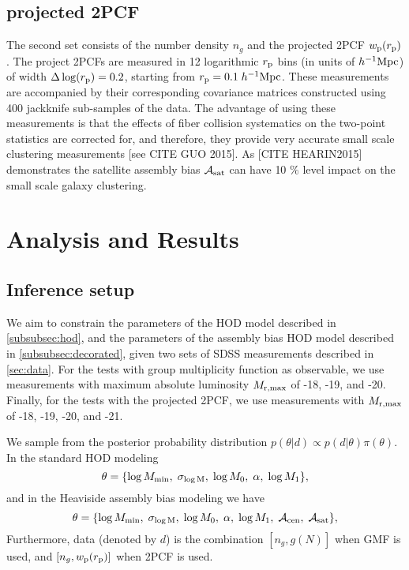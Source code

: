\documentclass[12pt, preprint]{emulateapj}
\newcommand{\beq}{\begin{equation}}
\newcommand{\eeq}{\end{equation}}
\newcommand{\mzero}{\log M_{0}}
\newcommand{\mone}{\log M_{1}}
\newcommand{\mmin}{\log M_{\rm min}}
\newcommand{\sigmam}{\sigma_{\log \rm M}}
\newcommand{\acen}{\mathcal{A}_{\rm cen}}
\newcommand{\asat}{\mathcal{A}_{\rm sat}}
\begin{document}
\subsection{projected 2PCF}

The second set consists of the number density $n_{g}$ and the projected 2PCF $w_{\rm{p}}(r_{\rm{p}})$. The project 2PCFs are measured in 12 logarithmic $r_{\rm p}$ bins (in units of $h^{-1}\rm{Mpc}$) of width $\Delta \log(r_{\rm p}) = 0.2$, starting from $r_{\rm{p}} = 0.1 \; h^{-1}\rm{Mpc}$. These measurements are accompanied by their corresponding covariance matrices constructed using 400 jackknife sub-samples of the data. The advantage of using these measurements is that the effects of fiber collision systematics on the two-point statistics are corrected for, and therefore, they provide very accurate small scale clustering measurements [see CITE GUO 2015]. As [CITE HEARIN2015] demonstrates the satellite assembly bias $\mathcal{A}_{\rm sat}$ can have 10 $\%$ level impact on the small scale galaxy clustering.  

\section{Analysis and Results}

\subsection{Inference setup}

We aim to constrain the parameters of the HOD model described in \ref{subsubsec:hod}, and the parameters of the assembly bias HOD model described in \ref{subsubsec:decorated}, given two sets of SDSS measurements described in \ref{sec:data}. For the tests with group multiplicity function as observable, we use measurements with maximum absolute luminosity $M_{\rm r , max}$ of -18, -19, and -20. Finally, for the tests with the projected 2PCF, we use measurements with $M_{\rm r , max}$ of -18, -19, -20, and -21.  

We sample from the posterior probability distribution $p(\theta|d) \propto p(d|\theta) \pi(\theta)$. In the standard HOD modeling 
\beq
\theta = \{ \mmin, \; \sigmam, \; \mzero, \; \alpha, \; \mone \},
\eeq
and in the Heaviside assembly bias modeling we have 
\beq
\theta = \{ \mmin, \; \sigmam, \; \mzero, \; \alpha, \; \mone, \; \acen, \; \asat \},
\eeq
Furthermore, data (denoted by $d$) is the combination $[n_{g},g(N)]$ when GMF is used, and $[n_{g}, w_{\rm{p}}(r_{\rm{p}})]$ when 2PCF is used.
\end{document}
